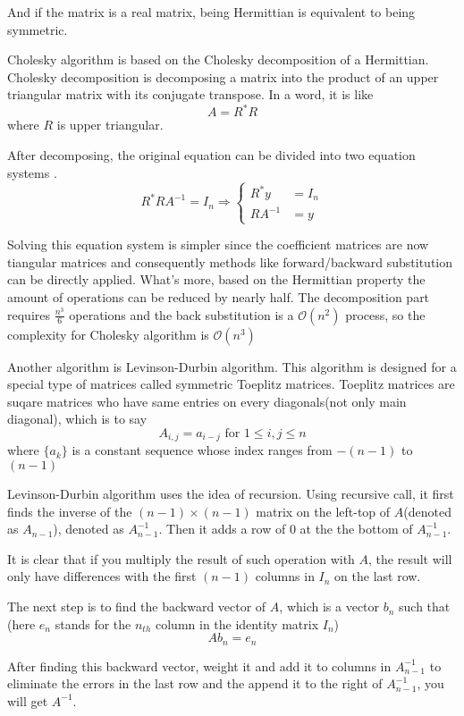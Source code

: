 \documentclass{article}
\begin{document}
And if the matrix is a real matrix, being Hermittian is equivalent to being symmetric. 

Cholesky algorithm is based on the Cholesky decomposition of a Hermittian. Cholesky decomposition is decomposing a matrix into the product of an upper triangular matrix with its conjugate transpose. In a word, it is like $$A = R^*R$$ where $R$ is upper triangular.

After decomposing, the original equation can be divided into two equation systems . $$R^*RA^{-1}=I_n \Rightarrow \begin{cases}R^*y &= I_n\\RA^{-1}&=y\end{cases}$$

Solving this equation system is simpler since the coefficient matrices are now tiangular matrices and consequently methods like forward/backward substitution can be directly applied. What's more, based on the Hermittian property the amount of operations can be reduced by nearly half. The decomposition part requires $\frac{n^3}{6}$ operations and the back substitution is a $\mathcal{O}(n^2)$ process, so the complexity for Cholesky algorithm is $\mathcal{O}(n^3)$

Another algorithm is Levinson-Durbin algorithm. This algorithm is designed for a special type of matrices called symmetric Toeplitz matrices. Toeplitz matrices are suqare matrices who have same entries on every diagonals(not only main diagonal), which is to say $$A_{i,j}=a_{i-j} \text{ for } 1\leq i,j \leq n$$ where $\{a_k\}$ is a constant sequence whose index ranges from $-(n-1)$ to $(n-1)$

Levinson-Durbin algorithm uses the idea of recursion. Using recursive call, it first finds the inverse of the $(n-1)\times (n-1)$ matrix on the left-top of $A$(denoted as $A_{n-1}$), denoted as $A_{n-1}^{-1}$. Then it adds a row of $0$ at the the bottom of $A_{n-1}^{-1}$. 

It is clear that if you multiply the result of such operation with $A$, the result will only have differences with the first $(n-1)$ columns in $I_n$ on the last row.

The next step is to find the backward vector of $A$, which is a vector $b_n$ such that (here $e_n$ stands for the $n_{th}$ column in the identity matrix $I_n$) $$Ab_n = e_n$$

After finding this backward vector, weight it and add it to columns in $A_{n-1}^{-1}$ to eliminate the errors in the last row and the append it to the right of $A_{n-1}^{-1}$, you will get $A^{-1}$.
\end{document}
